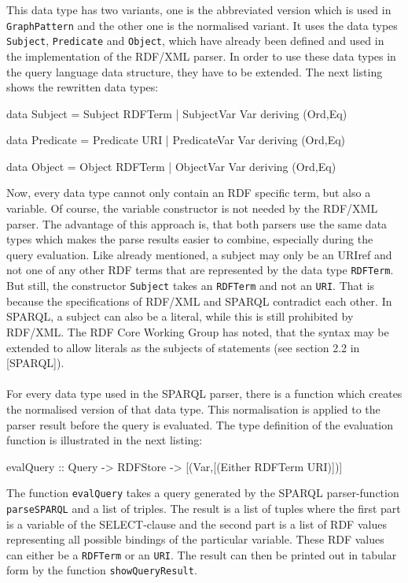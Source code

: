 \documentclass[11pt,a4paper,headsepline, bibtotoc]{scrreprt}
\begin{document}
This data type has two variants, one is the abbreviated version which is used in \texttt{GraphPattern} and the other one is the normalised variant. It uses the data types \texttt{Subject}, \texttt{Predicate} and \texttt{Object}, which have already been defined and used in the implementation of the RDF/XML parser. In order to use these data types in the query language data structure, they have to be extended. The next listing shows the rewritten data types:
\begin{code}
data Subject   = Subject RDFTerm 
                 | SubjectVar Var 
                 deriving (Ord,Eq)

data Predicate = Predicate URI 
                 | PredicateVar Var 
                 deriving (Ord,Eq)

data Object    = Object RDFTerm 
                 | ObjectVar Var 
                 deriving (Ord,Eq)
\end{code}
Now, every data type cannot only contain an RDF specific term, but also a variable. Of course, the variable constructor is not needed by the RDF/XML parser. The advantage of this approach is, that both parsers use the same data types which makes the parse results easier to combine, especially during the query evaluation. Like already mentioned, a subject may only be an URIref and not one of any other RDF terms that are represented by the data type \texttt{RDFTerm}. But still, the constructor \texttt{Subject} takes an \texttt{RDFTerm} and not an \texttt{URI}. That is because the specifications of RDF/XML and SPARQL contradict each other. In SPARQL, a subject can also be a literal, while this is still prohibited by RDF/XML. The RDF Core Working Group has noted, that the syntax may be extended to allow literals as the subjects of statements (see section 2.2 in [SPARQL]).\\
\\
For every data type used in the SPARQL parser, there is a function which creates the normalised version of that data type. This normalisation is applied to the parser result before the query is evaluated. The type definition of the evaluation function is illustrated in the next listing:
\begin{code}[caption={Query Evaluation Function},basicstyle=\ttfamily\small]
evalQuery :: Query -> RDFStore -> [(Var,[(Either RDFTerm URI)])]
\end{code}
The function \texttt{evalQuery} takes a query generated by the SPARQL parser-function \texttt{parse\-SPARQL} and a list of triples. The result is a list of tuples where the first part is a variable of the SELECT-clause and the second part is a list of RDF values representing all possible bindings of the particular variable. These RDF values can either be a \texttt{RDFTerm} or an \texttt{URI}. The result can then be printed out in tabular form by the function \texttt{showQueryResult}.\\
\end{document}
